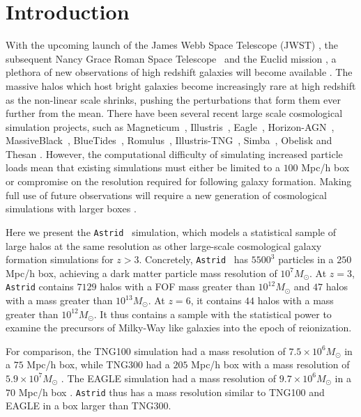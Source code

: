 \documentclass[fleqn,usenatbib]{mnras}
\def\astrid{\texttt{Astrid} }
\begin{document}
\section{Introduction}
With the upcoming launch of the James Webb Space Telescope (JWST) \citep{JWST}, the subsequent Nancy Grace Roman Space  Telescope~\citep[NGRST, formerly WFIRST][]{WFIRST} and the Euclid mission \citep{Euclid2019},
a plethora of new observations of high redshift galaxies will become available \citep[e.g~][]{2020MNRAS.492.5167V}. The massive halos which host bright galaxies become increasingly rare at high redshift as the non-linear scale shrinks, pushing the perturbations that form them ever further from the mean. There have been several recent large scale cosmological simulation projects, such as Magneticum~\citep{Hirschmann2014}, Illustris~\citep{Vogelsberger:2014}, Eagle~\citep{2015MNRAS.446..521S}, Horizon-AGN~\citep{Dubois2015,Volonteri2016Horizon-AGN}, MassiveBlack~\citep{Khandai2015}, BlueTides~\citep{Feng:2016}, Romulus~\citep{Tremmel2017}, Illustris-TNG~\citep{2018MNRAS.475..676S, 2018MNRAS.475..624N}, Simba~\citep{Dave2019-simba}, Obelisk \citep{2021A&A...653A.154T} and Thesan \citep{2021arXiv211000584K}. However, the computational difficulty of simulating increased particle loads mean that existing simulations must either be limited to a $100$ Mpc/h box or compromise on the resolution required for following galaxy formation. Making full use of future observations will require a new generation of cosmological simulations with larger boxes \citep{Pillepich:2018}.

Here we present the \astrid~simulation, which models a statistical sample of large halos at the same resolution as other large-scale cosmological galaxy formation simulations for $z > 3$. Concretely, \astrid~has $5500^3$ particles in a $250$ Mpc/h box, achieving a dark matter particle mass resolution of $10^7 M_\odot$. At $z=3$, \astrid contains $7129$ halos with a FOF mass greater than $10^{12} M_\odot$ and $47$ halos with a mass greater than $10^{13} M_\odot$. At $z=6$, it contains $44$ halos with a mass greater than $10^{12} M_\odot$. It thus contains a sample with the statistical power to examine the precursors of Milky-Way like galaxies into the epoch of reionization.

For comparison, the TNG100 simulation had a mass resolution of $7.5 \times 10^6 M_\odot$ in a $75$ Mpc/h box, while TNG300 had a $205$ Mpc/h box with a mass resolution of $5.9\times 10^7 M_\odot$ \citep{2018MNRAS.475..676S, 2018MNRAS.475..624N, 2018MNRAS.480.5113M,2018MNRAS.477.1206N}. The EAGLE simulation had a mass resolution of $9.7 \times 10^6 M_\odot$ in a $70$ Mpc/h box \citep{2015MNRAS.446..521S}. \astrid thus has a mass resolution similar to TNG100 and EAGLE in a box larger than TNG300. 
\end{document}
